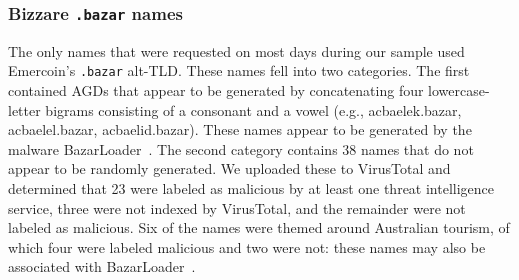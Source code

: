 \subsubsection{Bizzare \texttt{.bazar} names}

The only names that were requested on most days during our sample used 
Emercoin's \texttt{.bazar} 
alt-TLD. These names fell into two categories. The first 
contained AGDs that appear to be generated by concatenating four 
lowercase-letter bigrams consisting of a consonant and a vowel (e.g., 
acbaelek.bazar, acbaelel.bazar, acbaelid.bazar). These names appear to be 
generated by the 
malware BazarLoader~\cite{bazarloader_dga}. The second category contains 38 
names that do not appear to be randomly generated. We uploaded these to 
VirusTotal and determined that 23 were labeled as malicious by at least one 
threat intelligence service, three were not indexed by VirusTotal, and the 
remainder were not labeled as malicious. Six of the names were themed around 
Australian tourism, of which four were labeled malicious and two were not: 
these names may also be associated with 
BazarLoader~\cite{alienvault_bazarloader}. 


%	
%	
